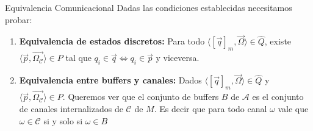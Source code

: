 \documentclass[10pt,xcolor={table,dvipsnames},t]{beamer}
\begin{document}
\begin{frame}{Equivalencia Comunicacional}
Dadas las condiciones establecidas necesitamos probar:
\begin{enumerate}
    \item \textbf{Equivalencia de estados discretos:} Para todo $\langle [\overrightarrow{q}]_m, \overrightarrow{\Omega} \rangle \in \widehat{Q}$, existe $\langle \overrightarrow{p}, \overrightarrow{\Omega_{\mathcal{C}}} \rangle \in P$ tal que $q_i \in \overrightarrow{q} \iff q_i \in \overrightarrow{p}$ y viceversa.
    \item \textbf{Equivalencia entre buffers y canales:} Dados $\langle [\overrightarrow{q}]_m, \overrightarrow{\Omega} \rangle \in \widehat{Q}$ y $\langle \overrightarrow{p}, \overrightarrow{\Omega_{\mathcal{C}}} \rangle \in P$. Queremos ver que el conjunto de buffers $B$ de $\mathcal{A}$ es el conjunto de canales internalizados de $\mathcal{C}$ de $M$. Es decir que para todo canal $\omega$ vale que $\omega \in \mathcal{C}$ si y solo si $\omega \in B$
\end{enumerate}
    
\end{frame}
\end{document}
